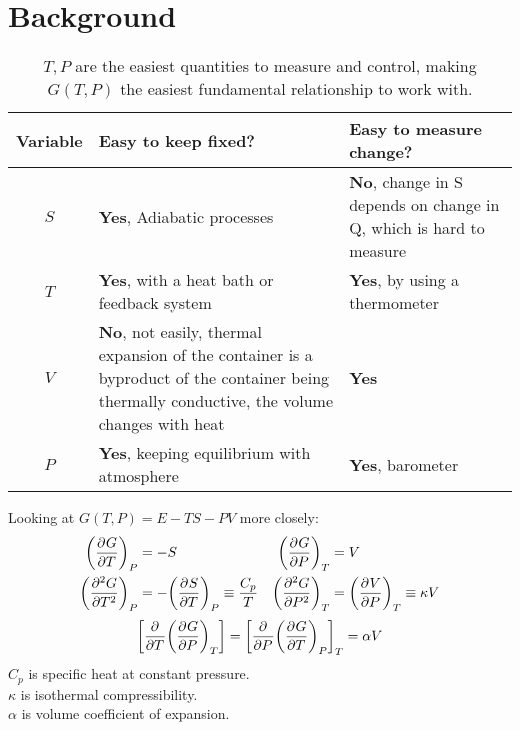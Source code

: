 \documentclass{article}
\begin{document}
\section{Background}
    \begin{table}[H]
        \renewcommand{\arraystretch}{1.5}
        \centering
        \begin{tabular}{|c|m{5.5cm}|m{5cm}|}
            \hline
            Variable & Easy to keep fixed? & Easy to measure change? 
            \\\hline
            $S$ & \textcolor{SpringGreen3}{\textbf{Yes}}, Adiabatic processes & \textcolor{OrangeRed3}{\textbf{No}}, change in S depends on change in Q, which is hard to measure
            \\\hline
            $T$ & \textcolor{SpringGreen3}{\textbf{Yes}}, with a heat bath or feedback system& \textcolor{SpringGreen3}{\textbf{Yes}}, by using a thermometer
            \\\hline
            $V$ & \textcolor{OrangeRed3}{\textbf{No}}, not easily, thermal expansion of the container is a byproduct of the container being thermally conductive, the volume changes with heat & \textcolor{SpringGreen3}{\textbf{Yes}}
            \\\hline
            $P$ & \textcolor{SpringGreen3}{\textbf{Yes}}, keeping equilibrium with atmosphere & \textcolor{SpringGreen3}{\textbf{Yes}}, barometer
            \\\hline
        \end{tabular}
        \caption{$T,P$ are the easiest quantities to measure and control, making $G(T,P)$ the easiest fundamental relationship to work with.}
    \end{table}
    Looking at $G(T,P)=E-TS-PV$ more closely: 
    \begin{align*}
        \pder{G}{T}[P]&=-S & \pder{G}{P}[T]&=V
        \\
        \pder[2]{G}{T}[P]&=-\pder{S}{T}[P]\equiv\frac{C_p}{T} & \pder[2]{G}{P}[T]&=\pder{V}{P}[T]\equiv\kappa V
    \end{align*}
    \begin{equation*}
        \qty[\pder{T}\pder{G}{P}[T]]=\qty[\pder{P}\pder{G}{T}[P]]_{T}=\alpha V
    \end{equation*}
    $C_p$ is specific heat at constant pressure. 
    \\
    $\kappa$ is isothermal compressibility.
    \\
    $\alpha$ is volume coefficient of expansion.
\end{document}
